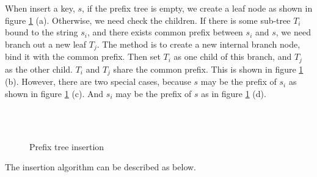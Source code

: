 \documentclass{article}
\begin{document}
When insert a key, $s$, if the prefix tree is empty, we
create a leaf node as shown in figure \ref{fig:patricia-insert} (a).
Otherwise, we need check the children.
If there is some sub-tree $T_i$ bound to the string $s_i$,
and there exists common prefix between $s_i$ and $s$, we
need branch out a new leaf $T_j$. The method is to
create a new internal branch node, bind it with the common
prefix. Then set $T_i$ as one child of this branch, and
$T_j$ as the other child. $T_i$ and $T_j$ share the common
prefix. This is shown in figure \ref{fig:patricia-insert} (b).
However, there are two special cases, because $s$ may be the prefix of $s_i$
as shown in figure \ref{fig:patricia-insert} (c). And
$s_i$ may be the prefix of $s$ as in figure \ref{fig:patricia-insert} (d).

\begin{figure}[htbp]
  \centering
  \hspace{.1\textwidth}
   \\
   \\
  \caption{Prefix tree insertion}
  \label{fig:patricia-insert}
\end{figure}

The insertion algorithm can be described as below.
\end{document}
